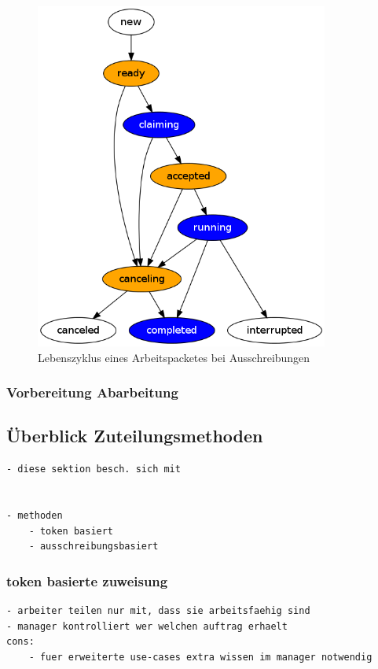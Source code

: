 \begin{figure}[ht] 
  \centering
  \label{fig:lebenszyklus-arbeitspaket}
  \includegraphics[height=4.5in]{imageinput/lebenszyklus-arbeitspaket.png}
  \caption{Lebenszyklus eines Arbeitspacketes bei Ausschreibungen}
\end{figure}


\subsubsection{Vorbereitung Abarbeitung}

\subsection{\"Uberblick Zuteilungsmethoden}


\begin{verbatim}
- diese sektion besch. sich mit


- methoden
    - token basiert
    - ausschreibungsbasiert

\end{verbatim}


\subsubsection{token basierte zuweisung}

\begin{verbatim}
- arbeiter teilen nur mit, dass sie arbeitsfaehig sind
- manager kontrolliert wer welchen auftrag erhaelt
cons:
    - fuer erweiterte use-cases extra wissen im manager notwendig
\end{verbatim}

